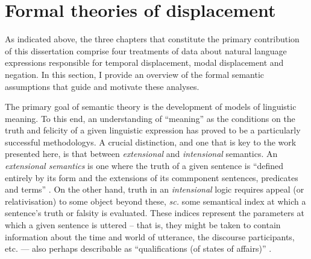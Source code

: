 \documentclass[12pt,dvipsnames]{report}
\begin{document}
%			
\section{Formal theories of displacement}\label{LitRev}






As indicated above, the three chapters that constitute the primary contribution of this dissertation comprise four treatments of data about natural language expressions responsible for temporal displacement, modal displacement and negation. In this section, I provide an overview of the formal semantic assumptions that guide and motivate these analyses.


The primary goal of semantic theory is the development of models of linguistic meaning. To this end, an understanding of ``meaning'' as the conditions on the truth and felicity of a given linguistic expression has proved to be a particularly successful methodologys. A crucial distinction, and one that is key to the work presented here, is that between \textit{extensional} and \textit{intensional} semantics. An \textit{extensional semantics} is one where the truth of a given sentence is ``defined entirely by its form and the extensions of its commponent sentences, predicates and terms'' \citep{Menzel2017}. On the other hand, truth in an \textit{intensional} logic requires appeal (or relativisation) to some object beyond these, \textit{sc.} some semantical index at which a sentence's truth or falsity is evaluated. These indices represent the parameters at which a given sentence is uttered -- that is, they might be taken to contain information about the time and world of utterance, the discourse participants, etc. --- also perhaps describable as ``qualifications (of states of affairs)'' \citep{Nuyts2005}.
\end{document}
